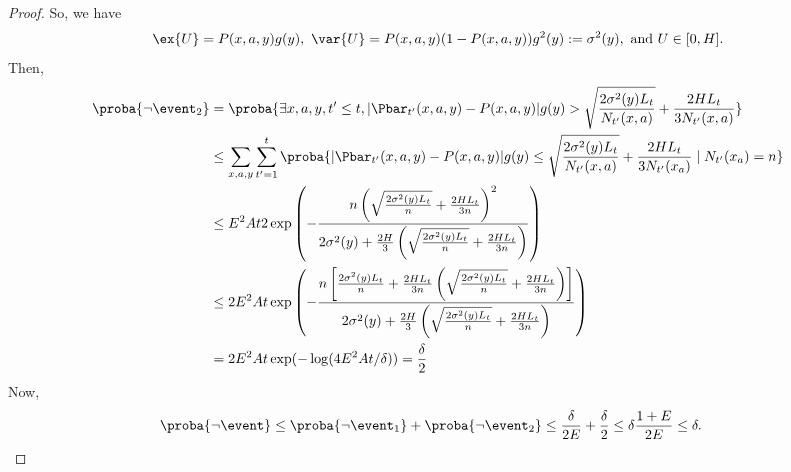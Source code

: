 \begin{proof}
So, we have
\begin{align*}
\ex{U}=P(x,a,y)g(y),\ \var{U}=P(x,a,y)(1-P(x,a,y))g^2(y):=\sigma^2(y), \text{ and } U\in[0,H].
\end{align*}
Then,
\begin{align*}
\proba{\neg\event_2}
&=\proba{\exists x,a,y,t'\le t,|\Pbar_{t'}(x,a,y)-P(x,a,y)|g(y) >\sqrt{\frac{2\sigma^2(y)L_t}{N_{t'}(x,a)}} +\frac{2HL_t}{3N_{t'}(x,a)}} \\
&\le\sum_{x,a,y} \sum_{t'=1}^{t} \proba{|\Pbar_{t'}(x,a,y)-P(x,a,y)|g(y) \le\sqrt{\frac{2\sigma^2(y)L_t}{N_{t'}(x,a)}} +\frac{2HL_t}{3N_{t'}(x_a)}\mid N_{t'}(x_a)=n} \\
&\le E^2At 2\exp\left(-\frac{n\left(\sqrt{\frac{2\sigma^2(y)L_t}{n}} +\frac{2HL_t}{3n}\right)^2}{2\sigma^2(y)+\frac{2H}{3}\left(\sqrt{\frac{2\sigma^2(y)L_t}{n}} +\frac{2HL_t}{3n}\right)}\right) \\
&\le 2E^2At\exp\left(-\frac{n\left[\frac{2\sigma^2(y)L_t}{n} +\frac{2HL_t}{3n}\left(\sqrt{\frac{2\sigma^2(y)L_t}{n}} +\frac{2HL_t}{3n}\right)\right]}{2\sigma^2(y)+\frac{2H}{3}\left(\sqrt{\frac{2\sigma^2(y)L_t}{n}} +\frac{2HL_t}{3n}\right)}\right) \\
&=2E^2At\exp(-\log(4E^2At/\delta)) = \frac{\delta}2
\end{align*}
Now,
\begin{align*}
\proba{\neg\event} 
&\le\proba{\neg\event_1} +\proba{\neg\event_2}\le\frac{\delta}{2E} +\frac{\delta}2\le \delta\frac{1+E}{2E} \le \delta.
\end{align*}
\end{proof}

